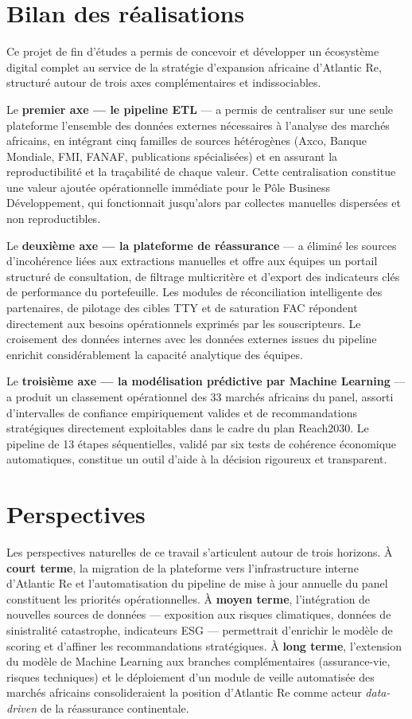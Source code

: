 \documentclass[12pt,a4paper]{report}
\begin{document}
\section*{Bilan des réalisations}

Ce projet de fin d'études a permis de concevoir et développer un écosystème digital
complet au service de la stratégie d'expansion africaine d'Atlantic Re, structuré
autour de trois axes complémentaires et indissociables.

Le \textbf{premier axe --- le pipeline ETL} --- a permis de centraliser sur une seule
plateforme l'ensemble des données externes nécessaires à l'analyse des marchés
africains, en intégrant cinq familles de sources hétérogènes (Axco, Banque Mondiale,
FMI, FANAF, publications spécialisées) et en assurant la reproductibilité et la
traçabilité de chaque valeur. Cette centralisation constitue une valeur ajoutée
opérationnelle immédiate pour le Pôle Business Développement, qui fonctionnait
jusqu'alors par collectes manuelles dispersées et non reproductibles.

Le \textbf{deuxième axe --- la plateforme de réassurance} --- a éliminé les sources
d'incohérence liées aux extractions manuelles et offre aux équipes un portail
structuré de consultation, de filtrage multicritère et d'export des indicateurs clés
de performance du portefeuille. Les modules de réconciliation intelligente des
partenaires, de pilotage des cibles TTY et de saturation FAC répondent directement
aux besoins opérationnels exprimés par les souscripteurs. Le croisement des données
internes avec les données externes issues du pipeline enrichit considérablement la
capacité analytique des équipes.

Le \textbf{troisième axe --- la modélisation prédictive par Machine Learning} --- a
produit un classement opérationnel des 33 marchés africains du panel, assorti
d'intervalles de confiance empiriquement valides et de recommandations stratégiques
directement exploitables dans le cadre du plan Reach2030. Le pipeline de 13 étapes
séquentielles, validé par six tests de cohérence économique automatiques, constitue
un outil d'aide à la décision rigoureux et transparent.

\section*{Perspectives}

Les perspectives naturelles de ce travail s'articulent autour de trois horizons. À
\textbf{court terme}, la migration de la plateforme vers l'infrastructure interne
d'Atlantic Re et l'automatisation du pipeline de mise à jour annuelle du panel
constituent les priorités opérationnelles. À \textbf{moyen terme}, l'intégration de
nouvelles sources de données --- exposition aux risques climatiques, données de
sinistralité catastrophe, indicateurs ESG --- permettrait d'enrichir le modèle de
scoring et d'affiner les recommandations stratégiques. À \textbf{long terme},
l'extension du modèle de Machine Learning aux branches complémentaires (assurance-vie,
risques techniques) et le déploiement d'un module de veille automatisée des marchés
africains consolideraient la position d'Atlantic Re comme acteur \textit{data-driven}
de la réassurance continentale.
\end{document}

